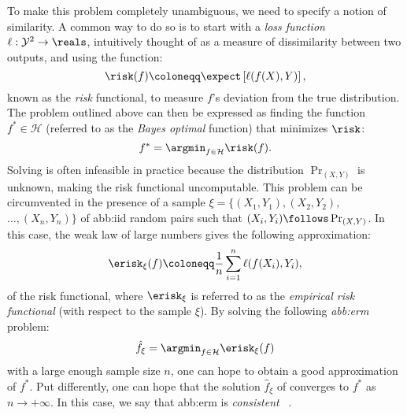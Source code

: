 To make this problem completely unambiguous,
we need to specify a notion of similarity.
A common way to do so is to start with
a \emph{loss function} \(\ell: \mathcal{Y}^{2} \to \reals\),
intuitively thought of as a measure of dissimilarity between two outputs,
and using the function:
\begin{equation}\label{eq:risk}
  \risk(f) \coloneqq \expect \left[ \ell(f(X), Y) \right],
\end{equation}
known as the \emph{risk} functional,
to measure \(f\)'s deviation from the true distribution.
The problem outlined above can then be expressed as finding the function
\(f^{\ast} \in \mathcal{H}\) (referred to as the \emph{Bayes optimal} function)
that minimizes \(\risk\):
\begin{equation}\label{eq:risk_minimization}
  f^{\ast} = \argmin_{f \in \mathcal{H}} \risk(f).
\end{equation}
Solving  is often infeasible in practice
because the distribution \(\Pr_{(X, Y)}\) is unknown,
making the risk functional  uncomputable.
This problem can be circumvented in the presence of a sample $\xi = \{ (X_{1}, Y_{1}), (X_{2}, Y_{2}),$ $ \ldots, (X_{n}, Y_{n}) \}$
of \gls{abb:iid} random pairs such that
\((X_{i}, Y_{i}) \follows \Pr_{(X, Y)}\).
In this case, the weak law of large numbers gives the following approximation:
\begin{equation}\label{eq:empirical_risk}
  \erisk_{\xi}(f) \coloneqq \frac{1}{n} \sum_{i=1}^{n} \ell(f(X_{i}), Y_{i}),
\end{equation}
of the risk functional,
where \(\erisk_{\xi}\)  is referred to as the \emph{empirical risk functional}
(with respect to the sample \(\xi\)).
By solving the following \emph{\gls{abb:erm}} problem:
\begin{equation}\label{eq:empirical_risk_minimization}
  \hat{f}_{\xi} = \argmin_{f \in \mathcal{H}} \erisk_{\xi}(f)
\end{equation}
with a large enough sample size \(n\),
one can hope to obtain a good approximation of \(f^{\ast}\).
Put differently, one can hope that the solution \(\hat{f}_{\xi}\)
of  converges to \(f^{\ast}\) as \(n \to +\infty\).
In this case, we say that \gls{abb:erm} is \emph{consistent}%
~\cite{%
  vapnikPrinciplesRiskMinimization1991,%
  vapnikNatureStatisticalLearning2010%
}.

